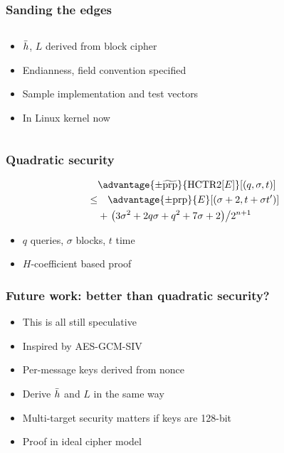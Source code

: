 \documentclass[aspectratio=169]{beamer}
\newenvironment*{figslide}{
    \begin{columns}
        \begin{column}{.4\textwidth}

}{
\end{column}
\begin{column}{.6\textwidth}
    \begin{figure}
        
    \end{figure}
\end{column}
\end{columns}
}
\begin{document}
\begin{frame}

\frametitle{Sanding the edges}
\begin{figslide}
    \begin{itemize}
        \item \(\bar{h}\), \(L\) derived from block cipher
        \item Endianness, field convention specified
        \item Sample implementation and test vectors
        \item In Linux kernel now
    \end{itemize}

\end{figslide}
\end{frame}

\begin{frame}

    \frametitle{Quadratic security}

    \begin{align*}
        &\advantage{\pm \widetilde{\mathrm{prp}}}{\HCTR[E]}[(q, \sigma, t)] \\
        \leq & \quad \advantage{\pm \mathrm{prp}}{E}[(\sigma + 2, t + \sigma t')] \\
        &+ \left.\left(3\sigma^2 + 2q\sigma + q^2 + 7\sigma + 2\right)\middle/2^{n+1}\right.
    \end{align*}
        

    \begin{itemize}
        \item \(q\) queries, \(\sigma\) blocks, \(t\) time
        \item \(H\)-coefficient based proof
    \end{itemize}
\end{frame}
    
\begin{frame}
\frametitle{Future work: better than quadratic security?}

\begin{itemize}
    \item This is all still speculative
    \item Inspired by AES-GCM-SIV
    \item Per-message keys derived from nonce
    \item Derive \(\bar{h}\) and \(L\) in the same way
    \item Multi-target security matters if keys are 128-bit
    \item Proof in ideal cipher model
\end{itemize}
\end{frame}
\end{document}
